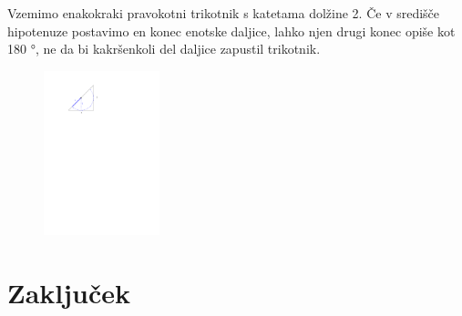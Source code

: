 \documentclass[a4paper, 12pt]{article}
\begin{document}
Vzemimo enakokraki pravokotni trikotnik s katetama dolžine 2. Če v središče hipotenuze postavimo en konec enotske daljice, lahko njen drugi konec opiše kot 180 °, ne da bi kakršenkoli del daljice zapustil trikotnik.

\begin{figure}[h!]
    \centering
    \includegraphics[width=0.3\textwidth]{ipe_slike/trikotnik.pdf}
    \label{trikotnik}
\end{figure}











\section*{Zaključek}


\printbibliography[heading=bibintoc, title={Literatura}]

\end{document}
